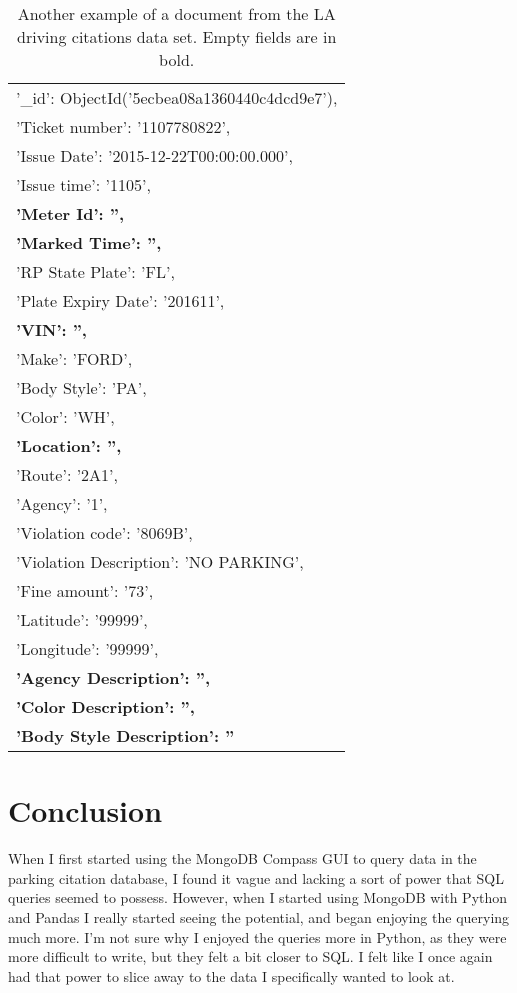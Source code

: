 \documentclass[]{article}
\begin{document}
\pagebreak
\begin{table}[!ht]
	\begin{center}
		\caption{Another example of a document from the LA driving citations data set.  Empty fields are in bold.}
		\label{tab:table1}
		\begin{tabular}{|l|} 
			\hline
			'\_id': ObjectId('5ecbea08a1360440c4dcd9e7'),\\
			'Ticket number': '1107780822',\\
			'Issue Date': '2015-12-22T00:00:00.000',\\
			'Issue time': '1105',\\
			\textbf{'Meter Id': '',}\\
			\textbf{'Marked Time': '',}\\
			'RP State Plate': 'FL',\\
			'Plate Expiry Date': '201611',\\
			\textbf{'VIN': '',}\\
			'Make': 'FORD',\\
			'Body Style': 'PA',\\
			'Color': 'WH',\\
			\textbf{'Location': '',}\\
			'Route': '2A1',\\
			'Agency': '1',\\
			'Violation code': '8069B',\\
			'Violation Description': 'NO PARKING',\\
			'Fine amount': '73',\\
			'Latitude': '99999',\\
			'Longitude': '99999',\\
			\textbf{'Agency Description': '',}\\
			\textbf{'Color Description': '',}\\
			\textbf{'Body Style Description': ''}\\
			\hline
		\end{tabular}
	\end{center}
\end{table}
\section{Conclusion}
When I first started using the MongoDB Compass GUI to query data in the parking citation database, I found it vague and lacking a sort of power that SQL queries seemed to possess.  However, when I started using MongoDB with Python and Pandas I really started seeing the potential, and began enjoying the querying much more.  I'm not sure why I enjoyed the queries more in Python, as they were more difficult to write, but they felt a bit closer to SQL.  I felt like I once again had that power to slice away to the data I specifically wanted to look at.
\end{document}

